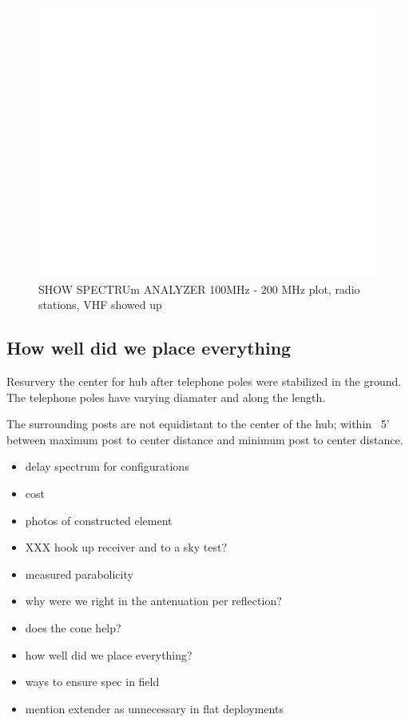 \documentclass[preprint]{aastex}  %
\begin{document}
\begin{figure}[H]
	\begin{center}
	\includegraphics[width =\textwidth]{empty}
	\caption{SHOW SPECTRUm ANALYZER 100MHz - 200 MHz plot, radio stations, VHF showed up
\label{Fig:} }
	\end{center}
\end{figure}


\subsection{How well did we place everything}
Resurvery the center for hub after telephone poles were stabilized in the ground. The telephone poles have varying diamater and along the length. 

The surrounding posts are not equidistant to the center of the hub; within ~5' between maximum post to center distance and minimum post to center distance.

 

\begin{itemize}
\item delay spectrum for configurations
\item cost
\item photos of constructed element
\item XXX hook up receiver and to a sky test?
\item measured parabolicity
\item why were we right in the antenuation per reflection?
\item does the cone help?
\item how well did we place everything?
\item ways to ensure spec in field
\item mention extender as unnecessary in flat deployments
\end{itemize}
\end{document}
